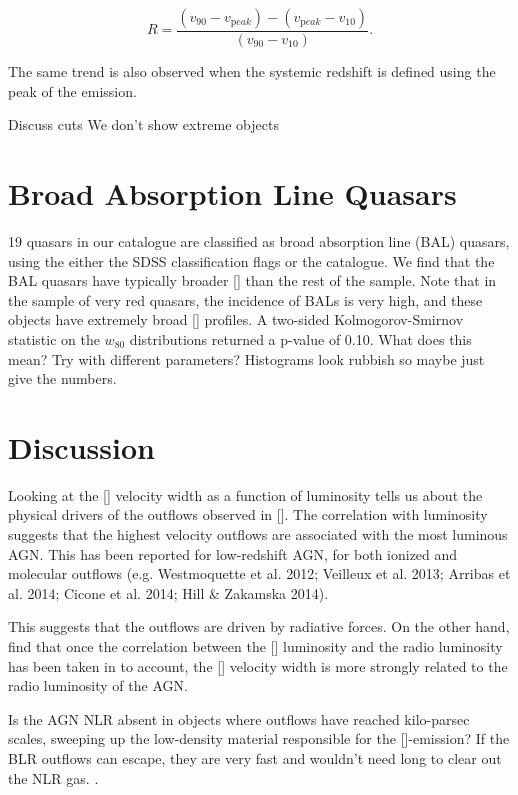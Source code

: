 \begin{equation}
  R = \frac{(v_{90} - v_{\mathrm peak}) - (v_{\mathrm peak} - v_{10})}{(v_{90} - v_{10})}.     
\end{equation} 

The same trend is also observed when the systemic redshift is defined using the peak of the \hb emission. 

Discuss cuts
We don't show extreme objects


\section{Broad Absorption Line Quasars}

19 quasars in our catalogue are classified as broad absorption line (BAL) quasars, using the either the \ac{SDSS} classification flags or the \citet{allen11} catalogue. 
We find that the BAL quasars have typically broader [] than the rest of the sample. 
Note that in the \citet{zakamska16} sample of very red quasars, the incidence of BALs is very high, and these objects have extremely broad [] profiles. 
A two-sided Kolmogorov-Smirnov statistic on the $w_{80}$ distributions returned a p-value of 0.10. 
What does this mean?
Try with different parameters?
Histograms look rubbish so maybe just give the numbers. 

\section{Discussion}

Looking at the [] velocity width as a function of luminosity tells us about the physical drivers of the outflows observed in []. 
The correlation with luminosity suggests that the highest velocity outflows are associated with the most luminous \ac{AGN}. 
This has been reported for low-redshift \ac{AGN}, for both ionized and molecular outflows (e.g. Westmoquette et al. 2012; Veilleux et al. 2013; Arribas et al. 2014; Cicone et al. 2014; Hill \& Zakamska 2014).

This suggests that the outflows are driven by radiative forces. 
On the other hand, \citet{mullaney13} find that once the correlation between the [] luminosity and the radio luminosity has been taken in to account, the [] velocity width is more strongly related to the radio luminosity of the \ac{AGN}. 

Is the \ac{AGN} \ac{NLR} absent in objects where outflows have reached kilo-parsec scales, sweeping up the low-density material responsible for the []-emission?
If the \ac{BLR} outflows can escape, they are very fast and wouldn't need long to clear out the \ac{NLR} gas. 
. 

